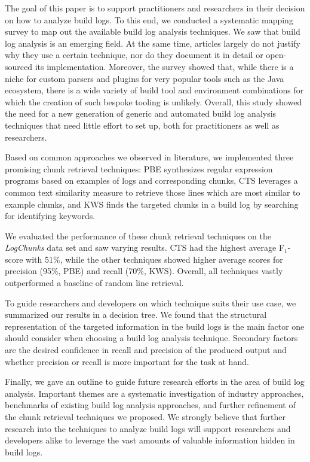 The goal of this paper is to support practitioners and researchers in
their decision on how to analyze build logs.
To this end, we
conducted a systematic mapping survey to map out the available build
log analysis techniques.
We saw that build log analysis is an
emerging field.
At the same time, articles largely do not justify why
they use a certain technique, nor do they document it in detail or
open-sourced its implementation.
Moreover, the survey showed that,
while there is a niche for custom parsers and plugins for very popular
tools such as the Java ecosystem, there is a wide variety of build
tool and environment combinations for which the creation of such
bespoke tooling is unlikely.
Overall, this study showed the need for a new
generation of generic and automated build log analysis techniques that
need little effort to set up, both for practitioners as well as
researchers.

Based on common approaches we observed in literature,
we implemented three promising chunk retrieval techniques:
PBE synthesizes regular expression programs based on examples of logs
and corresponding chunks, CTS leverages a common text similarity
measure to retrieve those lines which are most similar to example
chunks, and KWS finds the targeted chunks in a build log by searching
for identifying keywords.

We evaluated the performance of these chunk retrieval techniques on the
\emph{LogChunks} data set and saw varying results.
CTS had the highest average F$_{1}$-score with 51\%, while the other
techniques showed higher average scores for precision (95\%, PBE) and
recall (70\%, KWS).
Overall, all techniques vastly outperformed a
baseline of random line retrieval.

To guide researchers and developers on which technique suits their
use case,
we summarized our results in a decision tree.
We found
that the structural representation of the targeted information in the
build logs is the main factor one should consider when
choosing a build log analysis
technique.
Secondary factors are the desired confidence in recall and
precision of the produced output and whether precision or recall is
more important for the task at hand.

Finally, we gave an
outline to guide future research efforts in the area of build log
analysis.
Important themes are a systematic investigation of industry approaches,
benchmarks of existing build log analysis approaches, and further
refinement of the chunk retrieval techniques we proposed.
We strongly believe that further research into the techniques to
analyze build logs will support researchers and developers alike to
leverage the vast amounts of valuable information hidden
in build logs.
